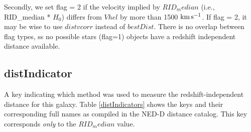 \documentclass[iop]{emulateapj-rtx4}
\newcommand{\kms}{$\rm km\, s^{-1}$}
\begin{document}



Secondly, we set flag = 2 if the velocity implied by $RID_median$ (i.e., RID\_median * $H_0$) differs from $Vhel$ by more than 1500 \kms. If flag = 2, it may be wise to use $distvcorr$ instead of $bestDist$. There is no overlap between flag types, ss no possible stars (flag=1) objects have a redshift independent distance available.

\subsection{distIndicator}
A key indicating which method was used to measure the redshift-independent distance for this galaxy. Table \ref{distIndicators} shows the keys and their corresponding full names as compiled in the NED-D distance catalog. This key corresponds \textit{only} to the $RID_median$ value.
\end{document}
